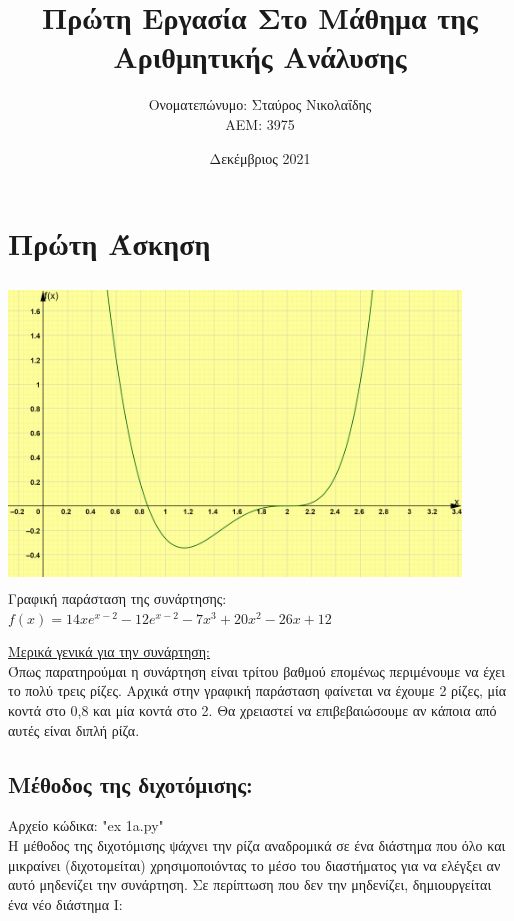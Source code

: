 \documentclass{article}
\title{Πρώτη Εργασία Στο Μάθημα της Αριθμητικής Ανάλυσης}
\author{Ονοματεπώνυμο: Σταύρος Νικολαΐδης  \\  ΑΕΜ: 3975}
\date{Δεκέμβριος 2021}
\begin{document}
\maketitle

\section{Πρώτη Άσκηση}

\includegraphics[width=12cm, height=8cm]{images/Figure_1.png} \\
Γραφική παράσταση της συνάρτησης: \( f(x) = 14xe^{x-2} - 12e^{x-2} - 7x^3 + 20x^2 - 26x + 12 \)

\vspace{5mm} 
\large{\underline{Μερικά γενικά για την συνάρτηση: }} \\
Όπως παρατηρούμαι η συνάρτηση είναι τρίτου βαθμού επομένως περιμένουμε να έχει το πολύ τρεις ρίζες. Αρχικά στην γραφική παράσταση φαίνεται να έχουμε 2 ρίζες, μία κοντά στο 0,8 και μία κοντά στο 2. Θα χρειαστεί να επιβεβαιώσουμε αν κάποια από αυτές είναι διπλή ρίζα.

\vspace{3mm}
\subsection{Μέθοδος της διχοτόμισης: }

Αρχείο κώδικα: "ex 1a.py" \\

Η μέθοδος της διχοτόμισης ψάχνει την ρίζα αναδρομικά σε ένα διάστημα που όλο και μικραίνει (διχοτομείται) χρησιμοποιόντας το μέσο του διαστήματος για να ελέγξει αν αυτό μηδενίζει την συνάρτηση. Σε περίπτωση που δεν την μηδενίζει, δημιουργείται ένα νέο διάστημα Ι: \\
\end{document}
